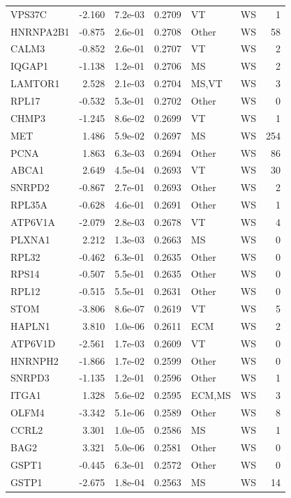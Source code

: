 \begin{table}[ht]
\begin{tabular}{lrlrllr}
  VPS37C & -2.160 & 7.2e-03 & 0.2709 & VT & WS & 1 \\ 
  HNRNPA2B1 & -0.875 & 2.6e-01 & 0.2708 & Other & WS & 58 \\ 
  CALM3 & -0.852 & 2.6e-01 & 0.2707 & VT & WS & 2 \\ 
  IQGAP1 & -1.138 & 1.2e-01 & 0.2706 & MS & WS & 2 \\ 
  LAMTOR1 & 2.528 & 2.1e-03 & 0.2704 & MS,VT & WS & 3 \\ 
  RPL17 & -0.532 & 5.3e-01 & 0.2702 & Other & WS & 0 \\ 
  CHMP3 & -1.245 & 8.6e-02 & 0.2699 & VT & WS & 1 \\ 
  MET & 1.486 & 5.9e-02 & 0.2697 & MS & WS & 254 \\ 
  PCNA & 1.863 & 6.3e-03 & 0.2694 & Other & WS & 86 \\ 
  ABCA1 & 2.649 & 4.5e-04 & 0.2693 & VT & WS & 30 \\ 
  SNRPD2 & -0.867 & 2.7e-01 & 0.2693 & Other & WS & 2 \\ 
  RPL35A & -0.628 & 4.6e-01 & 0.2691 & Other & WS & 1 \\ 
  ATP6V1A & -2.079 & 2.8e-03 & 0.2678 & VT & WS & 4 \\ 
  PLXNA1 & 2.212 & 1.3e-03 & 0.2663 & MS & WS & 0 \\ 
  RPL32 & -0.462 & 6.3e-01 & 0.2635 & Other & WS & 0 \\ 
  RPS14 & -0.507 & 5.5e-01 & 0.2635 & Other & WS & 0 \\ 
  RPL12 & -0.515 & 5.5e-01 & 0.2631 & Other & WS & 0 \\ 
  STOM & -3.806 & 8.6e-07 & 0.2619 & VT & WS & 5 \\ 
  HAPLN1 & 3.810 & 1.0e-06 & 0.2611 & ECM & WS & 2 \\ 
  ATP6V1D & -2.561 & 1.7e-03 & 0.2609 & VT & WS & 0 \\ 
  HNRNPH2 & -1.866 & 1.7e-02 & 0.2599 & Other & WS & 0 \\ 
  SNRPD3 & -1.135 & 1.2e-01 & 0.2596 & Other & WS & 1 \\ 
  ITGA1 & 1.328 & 5.6e-02 & 0.2595 & ECM,MS & WS & 3 \\ 
  OLFM4 & -3.342 & 5.1e-06 & 0.2589 & Other & WS & 8 \\ 
  CCRL2 & 3.301 & 1.0e-05 & 0.2586 & MS & WS & 1 \\ 
  BAG2 & 3.321 & 5.0e-06 & 0.2581 & Other & WS & 0 \\ 
  GSPT1 & -0.445 & 6.3e-01 & 0.2572 & Other & WS & 0 \\ 
  GSTP1 & -2.675 & 1.8e-04 & 0.2563 & MS & WS & 14 \\ 

\end{tabular}
\end{table}
